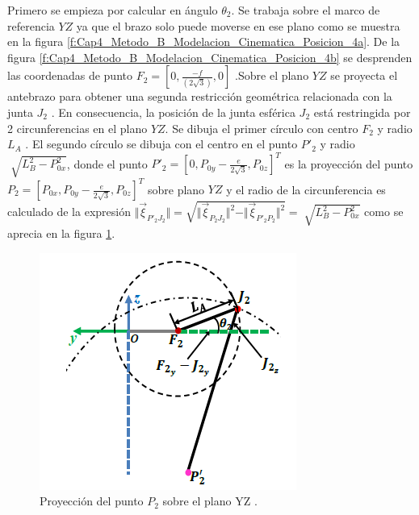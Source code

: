       Primero se empieza por calcular en ángulo $\theta_2$. Se trabaja sobre el marco de referencia $YZ$ ya que el brazo   solo puede moverse en ese plano como se muestra en la figura \ref{f:Cap4_Metodo_B_Modelacion_Cinematica_Posicion_4a}. De la figura \ref{f:Cap4_Metodo_B_Modelacion_Cinematica_Posicion_4b} se desprenden las coordenadas de punto $F_2=\left[0,\frac{-f}{(2\sqrt{3})},0\right]$ .Sobre el plano $ YZ $ se proyecta el antebrazo para obtener una segunda restricción geométrica relacionada con la junta  \( J_{2} \) . En consecuencia, la posición de la junta esférica  \( J_{2} \)  está restringida por 2 circunferencias en el plano $YZ$. Se dibuja el primer círculo con centro  \( F_{2} \)  y radio  \( L_{A} \) . El segundo círculo se dibuja con el centro en el punto  \( P'_{2} \)  y radio  \( \sqrt[]{L_{B}^{2}-P_{0x}^{2}} \), donde el punto $P'_{2}=\left[0,P_{0y}-\frac{e}{2\sqrt{3}},P_{0z}\right]^T$ es la proyección del punto $P_{2}=\left[P_{0x},P_{0y}-\frac{e}{2\sqrt{3}},P_{0z}\right]^T$ sobre plano $YZ$ y el radio de la circunferencia es calculado de la expresión  $\Vert \overrightarrow{\xi}_{P'_2J_2} \Vert = \sqrt{\Vert \overrightarrow{\xi}_{P_2J_2}\Vert^2-\Vert \overrightarrow{\xi}_{P'_2P_2}\Vert^2 }=\sqrt[]{L_{B}^{2}-P_{0x}^{2}}$       como se aprecia en la figura \ref{f:f:Cap4_Metodo_B_Modelacion_Cinematica_Posicion_44}.
      
     \newpage

            \begin{figure}[htb]
                 \centering
               \includegraphics[width=0.7\linewidth]{Main/Chapter4/Images4/Metodo_B_Modelacion_Cinematica_Posicion_4b.png}
               \caption{Proyección del punto $P_2$ sobre el plano YZ \cite{Path_Planning_and_Trajectory_Optimization}.}
               \label{f:f:Cap4_Metodo_B_Modelacion_Cinematica_Posicion_44}
            \end{figure}
            
